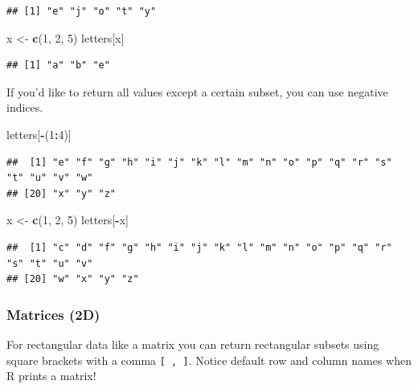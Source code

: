 \documentclass[
]{book}
\newenvironment{Shaded}{\begin{snugshade}}{\end{snugshade}}
\newcommand{\DecValTok}[1]{\textcolor[rgb]{0.00,0.00,0.81}{#1}}
\newcommand{\KeywordTok}[1]{\textcolor[rgb]{0.13,0.29,0.53}{\textbf{#1}}}
\newcommand{\NormalTok}[1]{#1}
\newcommand{\OperatorTok}[1]{\textcolor[rgb]{0.81,0.36,0.00}{\textbf{#1}}}
\newcommand{\StringTok}[1]{\textcolor[rgb]{0.31,0.60,0.02}{#1}}
\theoremstyle{definition}
\theoremstyle{definition}
\theoremstyle{definition}
\theoremstyle{remark}
\begin{document}
\begin{verbatim}
## [1] "e" "j" "o" "t" "y"
\end{verbatim}

\begin{Shaded}
\begin{Highlighting}[]
\NormalTok{x <-}\StringTok{ }\KeywordTok{c}\NormalTok{(}\DecValTok{1}\NormalTok{, }\DecValTok{2}\NormalTok{, }\DecValTok{5}\NormalTok{)}
\NormalTok{letters[x]}
\end{Highlighting}
\end{Shaded}

\begin{verbatim}
## [1] "a" "b" "e"
\end{verbatim}

If you'd like to return all values except a certain subset, you can use negative indices.

\begin{Shaded}
\begin{Highlighting}[]
\NormalTok{letters[}\OperatorTok{-}\NormalTok{(}\DecValTok{1}\OperatorTok{:}\DecValTok{4}\NormalTok{)]}
\end{Highlighting}
\end{Shaded}

\begin{verbatim}
##  [1] "e" "f" "g" "h" "i" "j" "k" "l" "m" "n" "o" "p" "q" "r" "s" "t" "u" "v" "w"
## [20] "x" "y" "z"
\end{verbatim}

\begin{Shaded}
\begin{Highlighting}[]
\NormalTok{x <-}\StringTok{ }\KeywordTok{c}\NormalTok{(}\DecValTok{1}\NormalTok{, }\DecValTok{2}\NormalTok{, }\DecValTok{5}\NormalTok{)}
\NormalTok{letters[}\OperatorTok{-}\NormalTok{x]}
\end{Highlighting}
\end{Shaded}

\begin{verbatim}
##  [1] "c" "d" "f" "g" "h" "i" "j" "k" "l" "m" "n" "o" "p" "q" "r" "s" "t" "u" "v"
## [20] "w" "x" "y" "z"
\end{verbatim}

\hypertarget{matrices-2d}{%
\subsubsection{Matrices (2D)}\label{matrices-2d}}

For rectangular data like a matrix you can return rectangular subsets using square brackets with a comma \texttt{{[}\ ,\ {]}}. Notice default row and column names when R prints a matrix!
\end{document}
